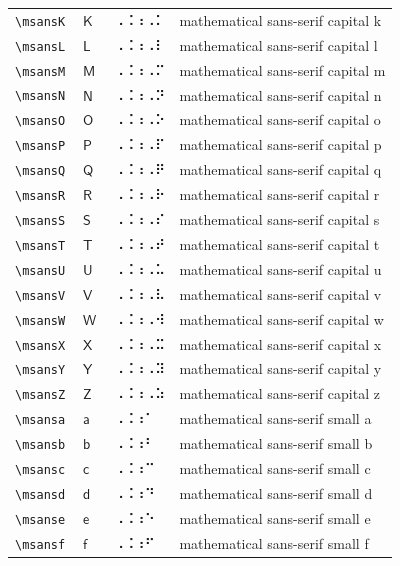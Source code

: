 \documentclass[oneside]{article}
\begin{document}
\begin{longtable}{llll}
\verb|\msansK| & $\msansK$ &  ⠠⠨⠰⠠⠅  & {mathematical sans-serif capital k} \\[2ex]
\verb|\msansL| & $\msansL$ &  ⠠⠨⠰⠠⠇  & {mathematical sans-serif capital l} \\[2ex]
\verb|\msansM| & $\msansM$ &  ⠠⠨⠰⠠⠍  & {mathematical sans-serif capital m} \\[2ex]
\verb|\msansN| & $\msansN$ &  ⠠⠨⠰⠠⠝  & {mathematical sans-serif capital n} \\[2ex]
\verb|\msansO| & $\msansO$ &  ⠠⠨⠰⠠⠕  & {mathematical sans-serif capital o} \\[2ex]
\verb|\msansP| & $\msansP$ &  ⠠⠨⠰⠠⠏  & {mathematical sans-serif capital p} \\[2ex]
\verb|\msansQ| & $\msansQ$ &  ⠠⠨⠰⠠⠟  & {mathematical sans-serif capital q} \\[2ex]
\verb|\msansR| & $\msansR$ &  ⠠⠨⠰⠠⠗  & {mathematical sans-serif capital r} \\[2ex]
\verb|\msansS| & $\msansS$ &  ⠠⠨⠰⠠⠎  & {mathematical sans-serif capital s} \\[2ex]
\verb|\msansT| & $\msansT$ &  ⠠⠨⠰⠠⠞  & {mathematical sans-serif capital t} \\[2ex]
\verb|\msansU| & $\msansU$ &  ⠠⠨⠰⠠⠥  & {mathematical sans-serif capital u} \\[2ex]
\verb|\msansV| & $\msansV$ &  ⠠⠨⠰⠠⠧  & {mathematical sans-serif capital v} \\[2ex]
\verb|\msansW| & $\msansW$ &  ⠠⠨⠰⠠⠺  & {mathematical sans-serif capital w} \\[2ex]
\verb|\msansX| & $\msansX$ &  ⠠⠨⠰⠠⠭  & {mathematical sans-serif capital x} \\[2ex]
\verb|\msansY| & $\msansY$ &  ⠠⠨⠰⠠⠽  & {mathematical sans-serif capital y} \\[2ex]
\verb|\msansZ| & $\msansZ$ &  ⠠⠨⠰⠠⠵  & {mathematical sans-serif capital z} \\[2ex]
\verb|\msansa| & $\msansa$ &  ⠠⠨⠰⠁  & {mathematical sans-serif small a} \\[2ex]
\verb|\msansb| & $\msansb$ &  ⠠⠨⠰⠃  & {mathematical sans-serif small b} \\[2ex]
\verb|\msansc| & $\msansc$ &  ⠠⠨⠰⠉  & {mathematical sans-serif small c} \\[2ex]
\verb|\msansd| & $\msansd$ &  ⠠⠨⠰⠙  & {mathematical sans-serif small d} \\[2ex]
\verb|\msanse| & $\msanse$ &  ⠠⠨⠰⠑  & {mathematical sans-serif small e} \\[2ex]
\verb|\msansf| & $\msansf$ &  ⠠⠨⠰⠋  & {mathematical sans-serif small f} \\[2ex]

\end{longtable}
\end{document}
